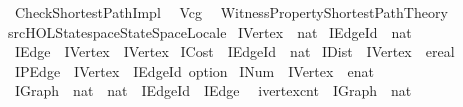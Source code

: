 %
\begin{isabellebody}%
\def\isabellecontext{Check{\isacharunderscore}Shortest{\isacharunderscore}Path{\isacharunderscore}Impl}%
%
\isadelimtheory
%
\endisadelimtheory
%
\isatagtheory
{}\isamarkupfalse%
\ Check{\isacharunderscore}Shortest{\isacharunderscore}Path{\isacharunderscore}Impl\isanewline
{}\isanewline
\ \ {\isachardoublequoteopen}Vcg{\isachardoublequoteclose}\isanewline
\ \ {\isachardoublequoteopen}{\isachardot}{\isachardot}{\isacharslash}Witness{\isacharunderscore}Property{\isacharslash}Shortest{\isacharunderscore}Path{\isacharunderscore}Theory{\isachardoublequoteclose}\isanewline
{\isachardoublequoteopen}{\isachartilde}{\isachartilde}{\isacharslash}src{\isacharslash}HOL{\isacharslash}Statespace{\isacharslash}StateSpaceLocale{\isachardoublequoteclose}\isanewline
{}%
\endisatagtheory
{\isafoldtheory}%
%
\isadelimtheory
\isanewline
%
\endisadelimtheory
\isanewline
{}\isamarkupfalse%
\ IVertex\ {\isacharequal}\ nat\isanewline
{}\isamarkupfalse%
\ IEdge{\isacharunderscore}Id\ {\isacharequal}\ nat\isanewline
{}\isamarkupfalse%
\ IEdge\ {\isacharequal}\ {\isachardoublequoteopen}IVertex\ {\isasymtimes}\ IVertex{\isachardoublequoteclose}\isanewline
{}\isamarkupfalse%
\ ICost\ {\isacharequal}\ {\isachardoublequoteopen}IEdge{\isacharunderscore}Id\ {\isasymRightarrow}\ nat{\isachardoublequoteclose}\isanewline
{}\isamarkupfalse%
\ IDist\ {\isacharequal}\ {\isachardoublequoteopen}IVertex\ {\isasymRightarrow}\ ereal{\isachardoublequoteclose}\isanewline
{}\isamarkupfalse%
\ IPEdge\ {\isacharequal}\ {\isachardoublequoteopen}IVertex\ {\isasymRightarrow}\ IEdge{\isacharunderscore}Id\ option{\isachardoublequoteclose}\isanewline
{}\isamarkupfalse%
\ INum\ {\isacharequal}\ {\isachardoublequoteopen}IVertex\ {\isasymRightarrow}\ enat{\isachardoublequoteclose}\isanewline
{}\isamarkupfalse%
\ IGraph\ {\isacharequal}\ {\isachardoublequoteopen}nat\ {\isasymtimes}\ nat\ {\isasymtimes}\ {\isacharparenleft}IEdge{\isacharunderscore}Id\ {\isasymRightarrow}\ IEdge{\isacharparenright}{\isachardoublequoteclose}\ \isanewline
\isanewline
{}\isamarkupfalse%
\ ivertex{\isacharunderscore}cnt\ {\isacharcolon}{\isacharcolon}\ {\isachardoublequoteopen}IGraph\ {\isasymRightarrow}\ nat{\isachardoublequoteclose}\isanewline

\end{isabellebody}
